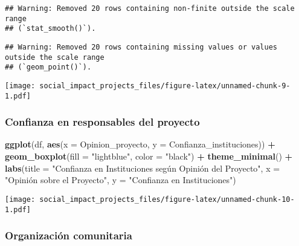 \documentclass[
]{article}
\newenvironment{Shaded}{\begin{snugshade}}{\end{snugshade}}
\newcommand{\AttributeTok}[1]{\textcolor[rgb]{0.13,0.29,0.53}{#1}}
\newcommand{\FunctionTok}[1]{\textcolor[rgb]{0.13,0.29,0.53}{\textbf{#1}}}
\newcommand{\NormalTok}[1]{#1}
\newcommand{\SpecialCharTok}[1]{\textcolor[rgb]{0.81,0.36,0.00}{\textbf{#1}}}
\newcommand{\StringTok}[1]{\textcolor[rgb]{0.31,0.60,0.02}{#1}}
\begin{document}
\begin{verbatim}
## Warning: Removed 20 rows containing non-finite outside the scale range
## (`stat_smooth()`).
\end{verbatim}

\begin{verbatim}
## Warning: Removed 20 rows containing missing values or values outside the scale range
## (`geom_point()`).
\end{verbatim}

\texttt{[image: social\_impact\_projects\_files/figure-latex/unnamed-chunk-9-1.pdf]}

\subsubsection{\texorpdfstring{\textbf{Confianza en responsables del
proyecto}}{Confianza en responsables del proyecto}}\label{confianza-en-responsables-del-proyecto}

\begin{Shaded}
\begin{Highlighting}[]
\FunctionTok{ggplot}\NormalTok{(df, }\FunctionTok{aes}\NormalTok{(}\AttributeTok{x =}\NormalTok{ Opinion\_proyecto, }\AttributeTok{y =}\NormalTok{ Confianza\_instituciones)) }\SpecialCharTok{+}
  \FunctionTok{geom\_boxplot}\NormalTok{(}\AttributeTok{fill =} \StringTok{"lightblue"}\NormalTok{, }\AttributeTok{color =} \StringTok{"black"}\NormalTok{) }\SpecialCharTok{+}
  \FunctionTok{theme\_minimal}\NormalTok{() }\SpecialCharTok{+}
  \FunctionTok{labs}\NormalTok{(}\AttributeTok{title =} \StringTok{"Confianza en Instituciones según Opinión del Proyecto"}\NormalTok{, }
       \AttributeTok{x =} \StringTok{"Opinión sobre el Proyecto"}\NormalTok{, }\AttributeTok{y =} \StringTok{"Confianza en Instituciones"}\NormalTok{)}
\end{Highlighting}
\end{Shaded}

\texttt{[image: social\_impact\_projects\_files/figure-latex/unnamed-chunk-10-1.pdf]}

\subsubsection{\texorpdfstring{\textbf{Organización
comunitaria}}{Organización comunitaria}}\label{organizaciuxf3n-comunitaria}
\end{document}
